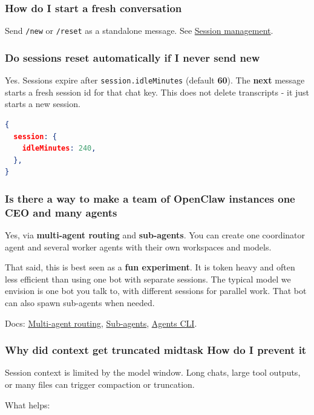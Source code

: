 \subsubsection{How do I start a fresh conversation}


Send \texttt{/new} or \texttt{/reset} as a standalone message. See \href{/concepts/session}{Session management}.

\subsubsection{Do sessions reset automatically if I never send new}


Yes. Sessions expire after \texttt{session.idleMinutes} (default \textbf{60}). The \textbf{next}
message starts a fresh session id for that chat key. This does not delete
transcripts - it just starts a new session.

\begin{lstlisting}[language=json]
{
  session: {
    idleMinutes: 240,
  },
}
\end{lstlisting}


\subsubsection{Is there a way to make a team of OpenClaw instances one CEO and many agents}


Yes, via \textbf{multi-agent routing} and \textbf{sub-agents}. You can create one coordinator
agent and several worker agents with their own workspaces and models.

That said, this is best seen as a \textbf{fun experiment}. It is token heavy and often
less efficient than using one bot with separate sessions. The typical model we
envision is one bot you talk to, with different sessions for parallel work. That
bot can also spawn sub-agents when needed.

Docs: \href{/concepts/multi-agent}{Multi-agent routing}, \href{/tools/subagents}{Sub-agents}, \href{/cli/agents}{Agents CLI}.

\subsubsection{Why did context get truncated midtask How do I prevent it}


Session context is limited by the model window. Long chats, large tool outputs, or many
files can trigger compaction or truncation.

What helps:

